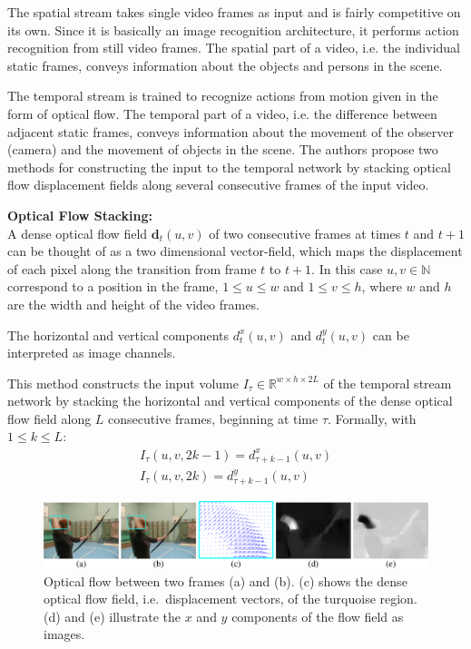 The spatial stream takes single video frames as input and is fairly competitive on its own.
Since it is basically an image recognition architecture, it performs action recognition from still video frames.
The spatial part of a video, i.e. the individual static frames, conveys information about the objects and persons in the scene.

The temporal stream is trained to recognize actions from motion given in the form of optical flow.
The temporal part of a video, i.e. the difference between adjacent static frames, conveys information about the movement of the observer (camera) and the movement of objects in the scene.
The authors propose two methods for constructing the input to the temporal network by stacking optical flow displacement fields along several consecutive frames of the input video.

\textbf{Optical Flow Stacking:} \\
A dense optical flow field $\mathbf{d}_t(u,v)$ of two consecutive frames at times $t$ and $t+1$ can be thought of as a two dimensional vector-field, which maps the displacement of each pixel along the transition from frame $t$ to $t+1$.
In this case $u,v \in \mathbb{N}$ correspond to a position in the frame, $1 \leq u \leq w$ and $1 \leq v \leq h$, where $w$ and $h$ are the width and height of the video frames.

The horizontal and vertical components $d_t^x(u,v)$ and $d_t^y(u,v)$ can be interpreted as image channels.

This method constructs the input volume $I_\tau \in \mathbb{R}^{w \times h \times 2L}$ of the temporal stream network by stacking the horizontal and vertical components of the dense optical flow field along $L$ consecutive frames, beginning at time $\tau$. Formally, with $1 \leq k \leq L$:
\begin{align*}
    I_\tau(u,v,2k-1) = d_{\tau + k - 1}^x(u,v) \\
    I_\tau(u,v,2k) = d_{\tau + k - 1}^{y}(u,v)
\end{align*}

\begin{figure}[H]
    \centering
    \includegraphics[width=\textwidth]{img_deep/twostream_flow}
    \caption{Optical flow between two frames (a) and (b). (c) shows the dense optical flow field, i.e.\ displacement vectors, of the turquoise region. (d) and (e) illustrate the $x$ and $y$ components of the flow field as images. \cite{simonyan_two-stream_2014}}
    \label{fig:twostream_flow}
\end{figure}

